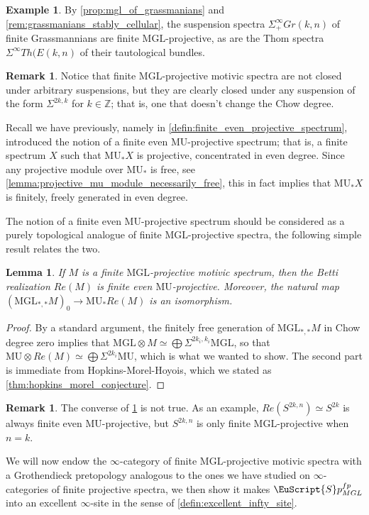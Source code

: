 \documentclass[oneside,a4paper]{amsart}
\newcommand{\euscr}[1]{\EuScript{#1}} %
\newcommand{\MU}{\mathrm{MU}} %
\newcommand{\MGL}{\mathrm{MGL}} %
\newcommand{\spectra}{\euscr{S}p} %
\newcommand{\spectramglfp}{\spectra_{MGL}^{fp}} %
\theoremstyle{plain}
\newtheorem{lemma}[thm]{Lemma}
\theoremstyle{definition}
\newtheorem{example}[thm]{Example}
\newtheorem{rem}[thm]{Remark}
\theoremstyle{remark}
\begin{document}
\begin{example}
\label{example:grassmanians_and_their_thom_spectra_are_mgl_fpe}
By \cref{prop:mgl_of_grassmanians} and \cref{rem:grassmanians_stably_cellular}, the suspension spectra $\Sigma^{\infty}_{+} Gr(k, n)$ of finite Grassmannians are finite $\MGL$-projective, as are the Thom spectra $\Sigma^{\infty} Th(E(k, n)$ of their tautological bundles. 
\end{example}

\begin{rem}
Notice that finite $\MGL$-projective motivic spectra are not closed under arbitrary suspensions, but they are clearly closed under any suspension of the form $\Sigma^{2k, k}$ for $k \in \mathbb{Z}$; that is, one that doesn't change the Chow degree.
\end{rem}
Recall we have previously, namely in \cref{defin:finite_even_projective_spectrum}, introduced the notion of a finite even $\MU$-projective spectrum; that is, a finite spectrum $X$ such that $\MU_{*}X$ is projective, concentrated in even degree. Since any projective module over $\MU_{*}$ is free, see \cref{lemma:projective_mu_module_necessarily_free}, this in fact implies that $\MU_{*}X$ is finitely, freely generated in even degree. 

The notion of a finite even $\MU$-projective spectrum should be considered as a purely topological analogue of finite $\MGL$-projective spectra, the following simple result relates the two. 

\begin{lemma}
\label{lemma:betti_realization_of_finite_mgl_projective_is_finite_even_mu_projective}
If $M$ is a finite $\MGL$-projective motivic spectrum, then the Betti realization $Re(M)$ is finite even $\MU$-projective. Moreover, the natural map $(\MGL_{*, *}M)_{0} \rightarrow \MU_{*} Re(M)$ is an isomorphism.  
\end{lemma}

\begin{proof}
By a standard argument, the finitely free generation of $\MGL_{*, *}M$ in Chow degree zero implies that $\MGL \otimes M \simeq \bigoplus \Sigma^{2k_{i}, k_{i}} \MGL$, so that $\MU \otimes Re(M) \simeq \bigoplus \Sigma^{2k_{i}} \MU$, which is what we wanted to show. The second part is immediate from Hopkins-Morel-Hoyois, which we stated as \cref{thm:hopkins_morel_conjecture}.
\end{proof}

\begin{rem}
The converse of \cref{lemma:betti_realization_of_finite_mgl_projective_is_finite_even_mu_projective} is not true. As an example, $Re(S^{2k, n}) \simeq S^{2k}$ is always finite even $\MU$-projective, but $S^{2k, n}$ is only finite $\MGL$-projective when $n = k$. 
\end{rem}
We will now endow the $\infty$-category of finite $\MGL$-projective motivic spectra with a Grothendieck pretopology analogous to the ones we have studied on $\infty$-categories of finite projective spectra, we then show it makes $\spectramglfp$ into an excellent $\infty$-site in the sense of \cref{defin:excellent_infty_site}.
\end{document}
